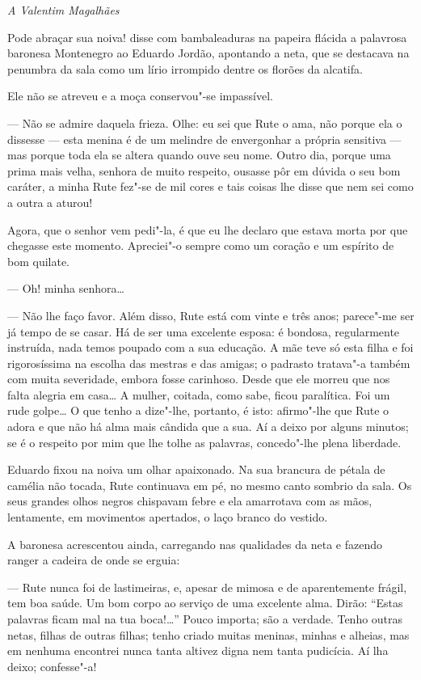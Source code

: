 \hfill\emph{A Valentim Magalhães}

\bigskip

\noindent{}Pode abraçar sua noiva! disse com bambaleaduras na papeira flácida a
palavrosa baronesa Montenegro ao Eduardo Jordão, apontando a neta, que
se destacava na penumbra da sala como um lírio irrompido dentre os
florões da alcatifa.

Ele não se atreveu e a moça conservou"-se impassível.

--- Não se admire daquela frieza. Olhe: eu sei que Rute o ama, não porque
ela o dissesse --- esta menina é de um melindre de envergonhar a própria
sensitiva --- mas porque toda ela se altera quando ouve seu nome. Outro
dia, porque uma prima mais velha, senhora de muito respeito, ousasse pôr
em dúvida o seu bom caráter, a minha Rute fez"-se de mil cores e tais
coisas lhe disse que nem sei como a outra a aturou!

Agora, que o senhor vem pedi"-la, é que eu lhe declaro que estava morta
por que chegasse este momento. Apreciei"-o sempre como um coração e um
espírito de bom quilate.

--- Oh! minha senhora\ldots{}

--- Não lhe faço favor. Além disso, Rute está com vinte e três anos;
parece"-me ser já tempo de se casar. Há de ser uma excelente esposa: é
bondosa, regularmente instruída, nada temos poupado com a sua educação.
A mãe teve só esta filha e foi rigorosíssima na escolha das mestras e
das amigas; o padrasto tratava"-a também com muita severidade, embora
fosse carinhoso. Desde que ele morreu que nos falta alegria em casa\ldots{} A
mulher, coitada, como sabe, ficou paralítica. Foi um rude golpe\ldots{} O que
tenho a dize"-lhe, portanto, é isto: afirmo"-lhe que Rute o adora e que
não há alma mais cândida que a sua. Aí a deixo por alguns minutos; se é
o respeito por mim que lhe tolhe as palavras, concedo"-lhe plena
liberdade.

Eduardo fixou na noiva um olhar apaixonado. Na sua brancura de pétala de
camélia não tocada, Rute continuava em pé, no mesmo canto sombrio da
sala. Os seus grandes olhos negros chispavam febre e ela amarrotava com
as mãos, lentamente, em movimentos apertados, o laço branco do vestido.

A baronesa acrescentou ainda, carregando nas qualidades da neta e
fazendo ranger a cadeira de onde se erguia:

--- Rute nunca foi de lastimeiras, e, apesar de mimosa e de aparentemente
frágil, tem boa saúde. Um bom corpo ao serviço de uma excelente alma.
Dirão: ``Estas palavras ficam mal na tua boca!\ldots{}'' Pouco importa; são a
verdade. Tenho outras netas, filhas de outras filhas; tenho criado
muitas meninas, minhas e alheias, mas em nenhuma encontrei nunca tanta
altivez digna nem tanta pudicícia. Aí lha deixo; confesse"-a!


